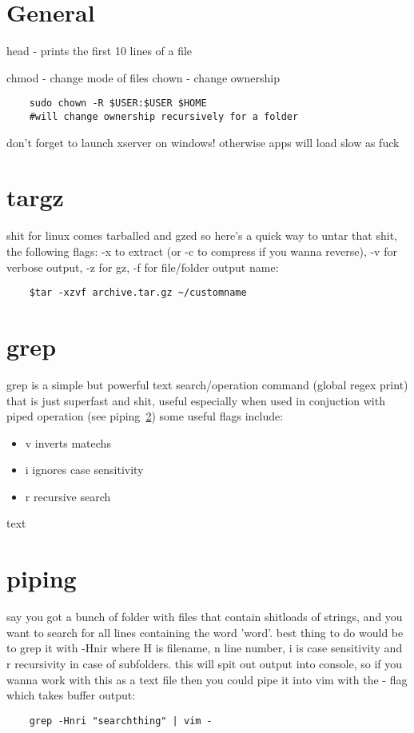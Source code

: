 \section*{General}%
\label{sec:section_name}

head - prints the first 10 lines of a file

chmod - change mode of files
chown - change ownership
\begin{verbatim}
	sudo chown -R $USER:$USER $HOME
	#will change ownership recursively for a folder
\end{verbatim}

don't forget to launch xserver on windows! otherwise apps will load slow as fuck

\section{targz}%
\label{sec:targz}

shit for linux comes tarballed and gzed so here's a quick way to untar that shit, the following flags: -x to extract (or -c to compress if you wanna reverse), -v for verbose output, -z for gz, -f for file/folder output name:
\begin{verbatim}
	$tar -xzvf archive.tar.gz ~/customname
\end{verbatim}
\section*{grep}%
\label{sec:grep}
grep is a simple but powerful text search/operation command (global regex print) that is just superfast and shit, useful especially when used in conjuction with piped operation (see piping~\ref{sec:piping})
some useful flags include:
\begin{itemize}
	\item v inverts matechs
	\item i ignores case sensitivity
	\item r recursive search
\end{itemize}
text
\section{piping}
\label{sec:piping}

say you got a bunch of  folder with files that contain shitloads of strings, and you want to search for all lines containing the word 'word'. best thing to do would be to grep it with -Hnir where H is filename, n line number, i is case sensitivity and r recursivity in case of subfolders. this will spit out output into console, so if you wanna work with this as a text file then you could pipe it into vim with the - flag which takes buffer output:
\begin{verbatim}
	grep -Hnri "searchthing" | vim -
\end{verbatim}

